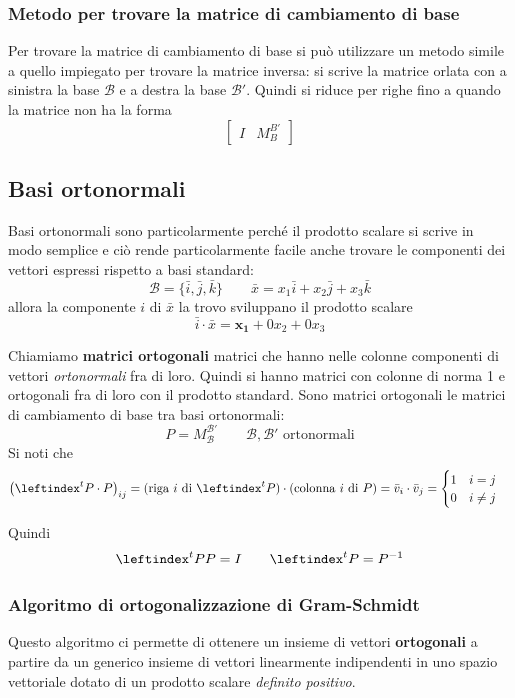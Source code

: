 \documentclass[x11names]{article}
\begin{document}
\subsubsection{Metodo per trovare la matrice di cambiamento di base}
Per trovare la matrice di cambiamento di base si può utilizzare un metodo simile a quello impiegato per trovare la matrice inversa: si scrive la matrice orlata con a sinistra la base $\mathscr{B}$ e a destra la base $\mathscr{B}'$. Quindi si riduce per righe fino a quando la matrice non ha la forma
\[
	\left[\begin{array}{c|c}
			I & M_{B}^{B'}
	\end{array}\right]
\] 

\subsection{Basi ortonormali}
Basi ortonormali sono particolarmente perché il prodotto scalare si scrive in modo semplice e ciò rende particolarmente facile anche trovare le componenti dei vettori espressi rispetto a basi standard:
\[
\mathcal{B} = \{\bar{i},\bar{j},\bar{k}\} \qquad \bar{x} = x_{1}\bar{i} + x_{2}\bar{j} +x_{3}\bar{k}
\]
allora la componente $i$ di $\bar{x}$ la trovo sviluppano il prodotto scalare 
\[
\bar{i} \cdot \bar{x} = \mathbf{x_{1}} + 0x_{2} + 0x_{3}
\]

\noindent
Chiamiamo \textbf{matrici ortogonali} matrici che hanno nelle colonne componenti di vettori \textit{ortonormali} fra di loro. Quindi si hanno matrici con colonne di norma 1 e ortogonali fra di loro con il prodotto standard. Sono matrici ortogonali le matrici di cambiamento di base tra basi ortonormali:
\[
P = M^{\mathcal{B}'}_{\mathcal{B}} \qquad \mathcal{B},\mathcal{B}' \text{ ortonormali}
\]
Si noti che 
\[
\left(\leftindex^{t}{P}\cdot P\right)_{ij} = (\text{riga } i \text{ di } \leftindex^{t}{P}) \cdot (\text{colonna } i \text{ di } P) = \bar{v}_{i} \cdot \bar{v}_{j} = \begin{cases}
	1 \quad i = j\\
	0 \quad i \neq j
\end{cases}
\] 

Quindi
\[
\leftindex^{t}{P}P = I \qquad \leftindex^{t}{P} = P^{-1}
\]

\subsubsection{Algoritmo di ortogonalizzazione di Gram-Schmidt }
Questo algoritmo ci permette di ottenere un insieme di vettori \textbf{ortogonali} a partire da un generico insieme di vettori linearmente indipendenti in uno spazio vettoriale dotato di un prodotto scalare \textit{definito positivo}.
\end{document}
